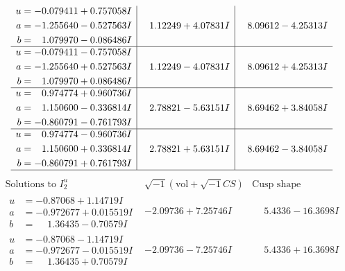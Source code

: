 \documentclass[1p]{elsarticle_modified}
\theoremstyle{definition}
\newcommand{\I}{\sqrt{-1}}
\begin{document}
$$\begin{array}{c|c|c}
\begin{aligned}
u &= -0.079411 + 0.757058 I \\
a &= -1.255640 - 0.527563 I \\
b &= \phantom{-}1.079970 - 0.086486 I\end{aligned}
 & \phantom{-}1.12249 + 4.07831 I & \phantom{-}8.09612 - 4.25313 I \\ \hline\begin{aligned}
u &= -0.079411 - 0.757058 I \\
a &= -1.255640 + 0.527563 I \\
b &= \phantom{-}1.079970 + 0.086486 I\end{aligned}
 & \phantom{-}1.12249 - 4.07831 I & \phantom{-}8.09612 + 4.25313 I \\ \hline\begin{aligned}
u &= \phantom{-}0.974774 + 0.960736 I \\
a &= \phantom{-}1.150600 - 0.336814 I \\
b &= -0.860791 - 0.761793 I\end{aligned}
 & \phantom{-}2.78821 - 5.63151 I & \phantom{-}8.69462 + 3.84058 I \\ \hline\begin{aligned}
u &= \phantom{-}0.974774 - 0.960736 I \\
a &= \phantom{-}1.150600 + 0.336814 I \\
b &= -0.860791 + 0.761793 I\end{aligned}
 & \phantom{-}2.78821 + 5.63151 I & \phantom{-}8.69462 - 3.84058 I\\
 \hline 
 \end{array}$$\newpage$$\begin{array}{c|c|c}  
\text{Solutions to }I^u_{2}& \I (\text{vol} + \sqrt{-1}CS) & \text{Cusp shape}\\
 \hline 
\begin{aligned}
u &= -0.87068 + 1.14719 I \\
a &= -0.972677 + 0.015519 I \\
b &= \phantom{-}1.36435 - 0.70579 I\end{aligned}
 & -2.09736 + 7.25746 I & \phantom{-}5.4336 - 16.3698 I \\ \hline\begin{aligned}
u &= -0.87068 - 1.14719 I \\
a &= -0.972677 - 0.015519 I \\
b &= \phantom{-}1.36435 + 0.70579 I\end{aligned}
 & -2.09736 - 7.25746 I & \phantom{-}5.4336 + 16.3698 I \\ \hline\begin{aligned}

\end{aligned}
\end{array}$$
\end{document}

